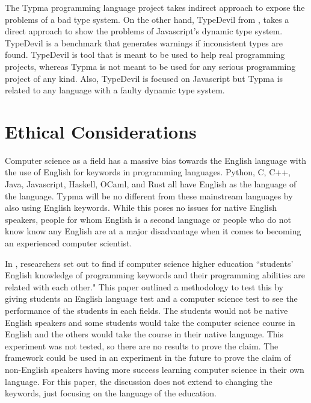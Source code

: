 \documentclass[10pt,twocolumn]{article}
\begin{document}
The Typma programming language project takes indirect approach to expose the problems of a bad type system. On the other hand, TypeDevil from \textcite{Pradel2014TypeDevil}, takes a direct approach to show the problems of Javascript's dynamic type system. TypeDevil is a benchmark that generates warnings if inconsistent types are found. TypeDevil is tool that is meant to be used to help real programming projects, whereas Typma is not meant to be used for any serious programming project of any kind. Also, TypeDevil is focused on Javascript but Typma is related to any language with a faulty dynamic type system. 

\section{Ethical Considerations}

Computer science as a field has a massive bias towards the English language with the use of English for keywords in programming languages. Python, C, C++, Java, Javascript, Haskell, OCaml, and Rust all have English as the language of the language. Typma will be no different from these mainstream languages by also using English keywords. While this poses no issues for native English speakers, people for whom English is a second language or people who do not know know any English are at a major disadvantage when it comes to becoming an experienced computer scientist. 

In \textcite{Veerasamy2014Teaching}, researchers set out to find if computer science higher education ``students’ English knowledge of programming keywords and their programming abilities are related with each other." This paper outlined a methodology to test this by giving students an English language test and a computer science test to see the performance of the students in each fields. The students would not be native English speakers and some students would take the computer science course in English and the others would take the course in their native language.
This experiment was not tested, so there are no results to prove the claim. The framework could be used in an experiment in the future to prove the claim of non-English speakers having more success learning computer science in their own language. For this paper, the discussion does not extend to changing the keywords, just focusing on the language of the education.
\end{document}
